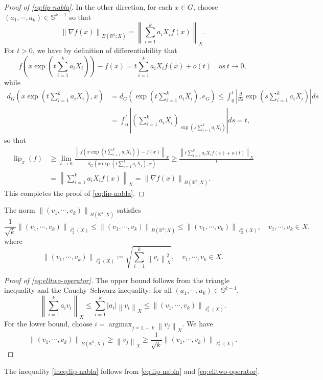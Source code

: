 \documentclass[11pt,reqno]{amsart}
\newcommand{\1}{\mathbf 1}
\begin{document}
\begin{proof}[Proof of \eqref{eq:lip-nabla}]
In the other direction, for each $x\in G$, choose $\left(a_1,\cdots,a_k\right)\in \mathbb{S}^{k-1}$ so that
\[
\left\|\nabla f(x)\right\|_{B\left(\mathbb{R}^k; X\right)}=\left\|\sum_{i=1}^ka_iX_if\left(x\right)\right\|_X.
\]
For $t>0$, we have by definition of differentiability that
\[
f\left(x\exp\left(t\sum_{i=1}^k a_iX_i\right)\right)-f\left(x\right)=t\sum_{i=1}^k a_iX_if\left(x\right)+o\left(t\right)\quad \mathrm{as~}t\to 0,
\]
while
\begin{align*}
d_G\left(x\exp\left(t\sum_{i=1}^k a_iX_i\right),x\right)&=d_G\left(\exp\left(t\sum_{i=1}^ka_iX_i\right),e_G\right)\le \int_0^t \left|\frac{d}{ds}\exp\left(s\sum_{i=1}^k a_iX_i\right)\right|ds\\
&=\int_0^t \left|\left(\sum_{i=1}^k a_iX_i\right)_{\exp\left(s\sum_{i=1}^k a_iX_i\right)}\right|ds=t,
\end{align*}
so that
\begin{align*}
\operatorname{lip}_x\left(f\right)&\ge \lim_{t\to 0}\frac{\left\|f\left(x\exp\left(t\sum_{i=1}^k a_iX_i\right)\right)-f\left(x\right)\right\|_X}{d_G\left(x\exp\left(t\sum_{i=1}^k a_iX_i\right),x\right)}\ge \frac{\left\|t\sum_{i=1}^k a_iX_if\left(x\right)+o\left(t\right)\right\|_X}{t}\\
&=\left\|\sum_{i=1}^k a_iX_if\left(x\right)\right\|_X= \left\|\nabla f\left(x\right)\right\|_{B\left(\mathbb{R}^k; X\right)}.
\end{align*}
This completes the proof of \eqref{eq:lip-nabla}.
\end{proof}

The norm $\left\|\left(v_1,\cdots,v_k\right)\right\|_{B\left(\mathbb{R}^k; X\right)}$ satisfies
\begin{equation}\label{eq:elltwo-operator}
    \frac{1}{\sqrt{k}}\left\|\left(v_1,\cdots,v_k\right)\right\|_{\ell_2^k\left(X\right)}\le \left\|\left(v_1,\cdots,v_k\right)\right\|_{B\left(\mathbb{R}^k; X\right)}\le \left\|\left(v_1,\cdots,v_k\right)\right\|_{\ell_2^k\left(X\right)},\quad v_1,\cdots,v_k\in X,
\end{equation}
where
\[
\left\|\left(v_1,\cdots,v_k\right)\right\|_{\ell_2^k\left(X\right)}\coloneqq \sqrt{\sum_{i=1}^k \left\|v_i\right\|_X^2},\quad v_1,\cdots,v_k\in X.
\]




\begin{proof}[Proof of \eqref{eq:elltwo-operator}]

The upper bound follows from the triangle inequality and the Cauchy--Schwarz inequality: for all $\left(a_1,\cdots,a_k\right)\in \mathbb{S}^{k-1}$,
\[
\left\|\sum_{i=1}^k a_iv_i\right\|_X\le \sum_{i=1}^k \left|a_i\right|\left\|v_i\right\|_X\le \left\|\left(v_1,\cdots,v_k\right)\right\|_{\ell_2^k\left(X\right)}.
\]
For the lower bound, choose $i=\operatorname{argmax}_{j=1,\cdots,k}\left\|v_j\right\|_X$. We have
\[
\left\|\left(v_1,\cdots,v_k\right)\right\|_{B\left(\mathbb{R}^k; X\right)}\ge \left\|v_j\right\|_X\ge \frac{1}{\sqrt{k}}\left\|\left(v_1,\cdots,v_k\right)\right\|_{\ell_2^k\left(X\right)}.
\]
\end{proof}
The inequality \eqref{ineq:lip-nabla} follows from \eqref{eq:lip-nabla} and \eqref{eq:elltwo-operator}.
\end{document}
